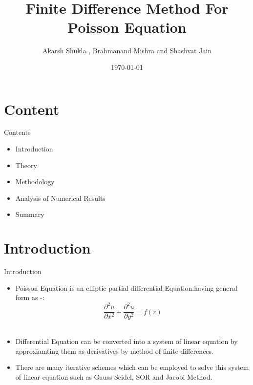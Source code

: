 \documentclass[10pt]{beamer}
\title{Finite Difference Method For Poisson Equation}
\date{\today}
\author{Akarsh Shukla , Brahmanand Mishra and Shashvat Jain}
\begin{document}
\maketitle

\section{Content}
\begin{frame}{Contents}

\begin{itemize}
\item Introduction 
\item Theory
\item Methodology
\item Analysis of Numerical Results
\item Summary 
\end{itemize}

\end{frame}

\section{Introduction}
\begin{frame}{Introduction}
	\begin{itemize}
		\item  Poisson Equation is an elliptic partial differential Equation.having general form as -: \\
	 \[  
		\frac{\partial^2 u}{\partial x^2} + \frac{\partial^2 u}{\partial y^2} =  f({r})
		\] \\
		\item Differential Equation can be converted into a system of linear equation by approxiamting them as derivatives by method of finite differences.
		\item There are many iterative schemes which can be employed to solve this system of linear equation such as Gauss Seidel, SOR and Jacobi Method.
		
		
	\end{itemize}
  
   
\end{frame}
\end{document}
